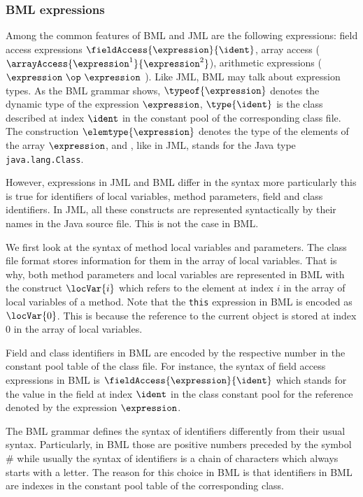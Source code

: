 \subsubsection{BML expressions}
Among the common features of BML and JML are the following expressions:
field access expressions $\fieldAccess{ \expression}{\ident}$, array access  
($\arrayAccess{\expression^1} {\expression^2} $),  arithmetic expressions
($\expression \ \op \ \expression$ ). Like JML, BML may talk about expression types.
As the BML grammar shows,  $ \typeof{\expression}$  denotes the dynamic type of the expression $\expression$, 
 $ \type{ \ident } $  is the class  described at index $\ident$ in the constant pool of the corresponding class file.
The construction $\elemtype{\expression}$ denotes the type of the elements of the array $\expression$,
and \TYPE, like in JML, stands for the Java type \texttt{java.lang.Class}. 

However, expressions in JML and BML differ in the syntax more particularly this is true for identifiers 
of local variables, method parameters, field and class identifiers. In JML, all these constructs
 are represented syntactically by their names in the Java source file. This is not the case in BML.

 We first look at the syntax of method local variables and parameters.
 The class file format stores information for them in the array of local variables.
 That is why, both method parameters and local variables are represented in BML 
 with the construct  $\locVar{i}$ which refers to the element at index $i$ in the array of local
 variables of a method. Note that the \texttt{this} expression in BML is encoded
 as $\locVar{0}$. This is because the reference to the current object is stored at index 0 in the array of local variables.

 
 Field and class identifiers in BML are encoded by the respective number in the constant pool table of the class file.
 For instance, the syntax of field access expressions  in BML is $\fieldAccess{\expression}{\ident}$ which 
 stands for the value in the field at index $\ident$ in the class constant pool 
 for the reference denoted by the expression  $ \expression $. 

 The BML grammar defines the syntax of identifiers differently from their usual syntax.
 Particularly, in BML those are positive numbers preceded by the symbol \# while usually
 the syntax of identifiers is a chain of characters which always starts with a letter. 
 The reason for this choice in BML  is that identifiers in BML are indexes in the constant
 pool table of the corresponding class.     

